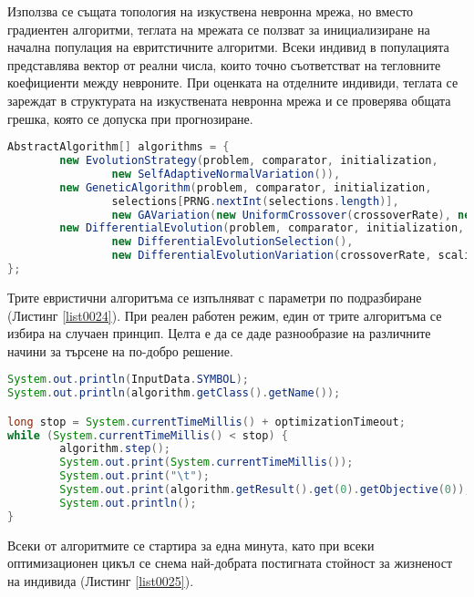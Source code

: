 Използва се същата топология на изкуствена невронна мрежа, но вместо градиентен алгоритми, теглата на мрежата се ползват за инициализиране на начална популация на евритстичните алгоритми. Всеки индивид в популацията представлява вектор от реални числа, които точно съответстват на тегловните коефициенти между невроните. При оценката на отделните индивиди, теглата се зареждат в структурата на изкуствената невронна мрежа и се проверява общата грешка, която се допуска при прогнозиране. 

\begin{lstlisting}[caption=Евристични алгоритми, language=Java, basicstyle=\tiny, label=list0024]
AbstractAlgorithm[] algorithms = {
        new EvolutionStrategy(problem, comparator, initialization,
                new SelfAdaptiveNormalVariation()),
        new GeneticAlgorithm(problem, comparator, initialization,
                selections[PRNG.nextInt(selections.length)],
                new GAVariation(new UniformCrossover(crossoverRate), new Insertion(mutationRate))),
        new DifferentialEvolution(problem, comparator, initialization,
                new DifferentialEvolutionSelection(),
                new DifferentialEvolutionVariation(crossoverRate, scalingFactor))
};
\end{lstlisting}

Трите евристични алгоритъма се изпълняват с параметри по подразбиране (Листинг \ref{list0024}). При реален работен режим, един от трите алгоритъма се избира на случаен принцип. Целта е да се даде разнообразие на различните начини за търсене на  по-добро решение. 

\begin{lstlisting}[caption=Отчитане на междинните стойности в процеса по оптимизация, language=Java, basicstyle=\tiny, label=list0025]
System.out.println(InputData.SYMBOL);
System.out.println(algorithm.getClass().getName());

long stop = System.currentTimeMillis() + optimizationTimeout;
while (System.currentTimeMillis() < stop) {
        algorithm.step();
        System.out.print(System.currentTimeMillis());
        System.out.print("\t");
        System.out.print(algorithm.getResult().get(0).getObjective(0));
        System.out.println();
}
\end{lstlisting}

Всеки от алгоритмите се стартира за една минута, като при всеки оптимизационен цикъл се снема най-добрата постигната стойност за жизненост на индивида (Листинг \ref{list0025}).

